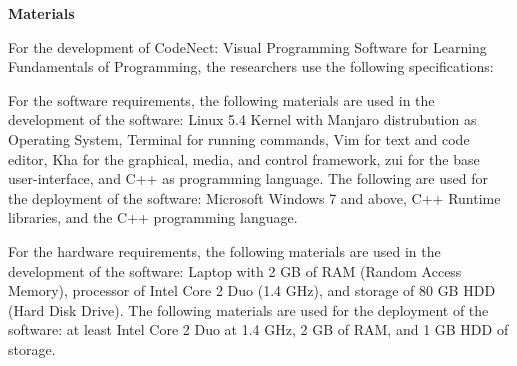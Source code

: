 \flushleft
\textbf{Materials}\\
\justifying

\parx
For the development of CodeNect: Visual Programming Software for Learning
Fundamentals of Programming, the researchers use the following specifications:

\parx
For the software requirements, the following materials are used in the
development of the software: Linux 5.4 Kernel with Manjaro distrubution as
Operating System, Terminal for running commands, Vim for text and code editor,
Kha for the graphical, media, and control framework, zui for the base
user-interface, and C++ as programming language. The following are used for the
deployment of the software: Microsoft Windows 7 and above, C++ Runtime
libraries, and the C++ programming language.

\parx
For the hardware requirements, the following materials are used in the
development of the software: Laptop with 2 GB of RAM (Random Access Memory),
processor of Intel Core 2 Duo (1.4 GHz), and storage of 80 GB HDD (Hard Disk
Drive). The following materials are used for the deployment of the software: at
least Intel Core 2 Duo at 1.4 GHz, 2 GB of RAM, and 1 GB HDD of storage.
